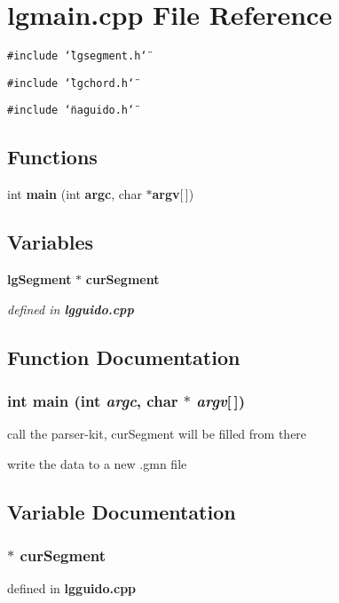 \section{lgmain.cpp File Reference}
\label{lgmain_8cpp}
{\tt \#include \char`\"{}lgsegment.h\char`\"{}}\par
{\tt \#include \char`\"{}lgchord.h\char`\"{}}\par
{\tt \#include \char`\"{}naguido.h\char`\"{}}\par
\subsection*{Functions}
\begin{CompactItemize}
\item 
int {\bf main} (int {\bf argc}, char $\ast${\bf argv}[$\,$])
\end{CompactItemize}
\subsection*{Variables}
\begin{CompactItemize}
\item 
{\bf lg\-Segment} $\ast$ {\bf cur\-Segment}
\begin{CompactList}\small\item\em defined in {\bf lgguido.cpp} \item\end{CompactList}\end{CompactItemize}


\subsection{Function Documentation}
\subsubsection{\setlength{\rightskip}{0pt plus 5cm}int main (int {\em argc}, char $\ast$ {\em argv}[$\,$])}\label{lgmain_8cpp_a1}


call the parser-kit, cur\-Segment will be filled from there

write the data to a new .gmn file 

\subsection{Variable Documentation}
\subsubsection{$\ast$ {\bf cur\-Segment}}\label{lgmain_8cpp_a0}


defined in {\bf lgguido.cpp} 


